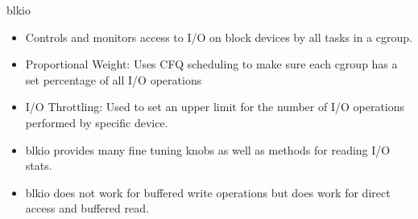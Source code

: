 \documentclass[pdf]{beamer}
\begin{document}
\begin{frame}{blkio}
\begin{itemize}
\small
\item Controls and monitors access to I/O on block devices by all tasks in a cgroup.
\item Proportional Weight: Uses CFQ scheduling to make sure each cgroup has a set percentage of all I/O operations
\item I/O Throttling: Used to set an upper limit for the number of I/O operations performed by specific device. 
\item blkio provides many fine tuning knobs as well as methods for reading I/O stats.
\item  \color{candypink}blkio does not work for buffered write operations but \color{cobalt}does work for direct access and buffered read.
\end{itemize}
\end{frame}
\end{document}
